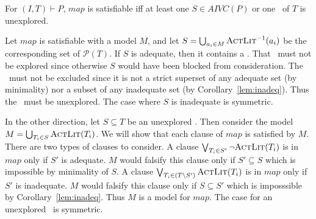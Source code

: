 \begin{lemma}
\label{lem:map:comp}
For $(I, T) \vdash P$, $map$ is satisfiable iff
at least one $S \in AIVC(P)$ or one \mis\ of $T$ is unexplored.
\end{lemma}
\begin{IEEEproof}
Let $map$ is satisfiable with a model $M$, and let $S = \bigcup_{a_i
  \in M} \textsc{ActLit} ^{-1} (a_i)$ be the corresponding set of
$\mathcal{P}(T)$. If $S$ is adequate, then it contains a \mivc. That
\mivc\ must not be explored since otherwise $S$ would have been blocked
from consideration. The \mivc\ must not be excluded since it is not a
strict superset of any adequate set (by minimality) nor a subset of
any inadequate set (by Corollary~\ref{lem:inadeq}). Thus the \mivc\ must
be unexplored. The case where $S$ is inadequate is symmetric.

In the other direction, let $S \subseteq T$ be an unexplored \mivc.
Then consider the model $M = \bigcup_{T_i\in S} \textsc{ActLit}(T_i)$. We will
show that each clause of $map$ is satisfied by $M$. There are two
types of clauses to consider. A clause $\bigvee_{T_{i}\in S'} \neg
{\textsc{ActLit}(T_i)}$ is in $map$ only if $S'$ is adequate. $M$ would
falsify this clause only if $S' \subseteq S$ which is impossible by
minimality of $S$. A clause $\bigvee_{T_{i}\in (T \setminus S')}
\textsc{ActLit} (T_i)$ is in $map$ only if $S'$ is inadequate. $M$ would
falsify this clause only if $S \subseteq S'$ which is imposssible by
Corollary~\ref{lem:inadeq}. Thus $M$ is a model for $map$. The case
for an unexplored \mis\ is symmetric.
\end{IEEEproof}


